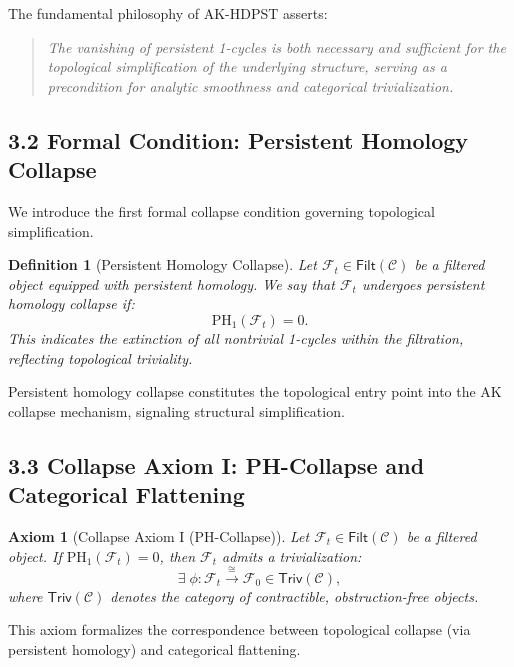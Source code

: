 \documentclass[11pt]{article}
\newtheorem{definition}[theorem]{Definition}
\newtheorem{axiom}{Axiom}[section]
\begin{document}
The fundamental philosophy of AK-HDPST asserts:

\begin{quote}
\textit{
The vanishing of persistent 1-cycles is both necessary and sufficient for the topological simplification of the underlying structure,  
serving as a precondition for analytic smoothness and categorical trivialization.
}
\end{quote}

\subsection*{3.2 Formal Condition: Persistent Homology Collapse}

We introduce the first formal collapse condition governing topological simplification.

\begin{definition}[Persistent Homology Collapse]
Let \( \mathcal{F}_t \in \mathsf{Filt}(\mathcal{C}) \) be a filtered object equipped with persistent homology.  
We say that \( \mathcal{F}_t \) undergoes \emph{persistent homology collapse} if:
\[
\mathrm{PH}_1(\mathcal{F}_t) = 0.
\]
This indicates the extinction of all nontrivial 1-cycles within the filtration, reflecting topological triviality.
\end{definition}

Persistent homology collapse constitutes the topological entry point into the AK collapse mechanism, signaling structural simplification.

\subsection*{3.3 Collapse Axiom I: PH-Collapse and Categorical Flattening}

\begin{axiom}[Collapse Axiom I (PH-Collapse)]
Let \( \mathcal{F}_t \in \mathsf{Filt}(\mathcal{C}) \) be a filtered object.  
If \( \mathrm{PH}_1(\mathcal{F}_t) = 0 \), then \( \mathcal{F}_t \) admits a trivialization:
\[
\exists \; \phi: \mathcal{F}_t \overset{\cong}{\longrightarrow} \mathcal{F}_0 \in \mathsf{Triv}(\mathcal{C}),
\]
where \( \mathsf{Triv}(\mathcal{C}) \) denotes the category of contractible, obstruction-free objects.
\end{axiom}

This axiom formalizes the correspondence between topological collapse (via persistent homology) and categorical flattening.
\end{document}
